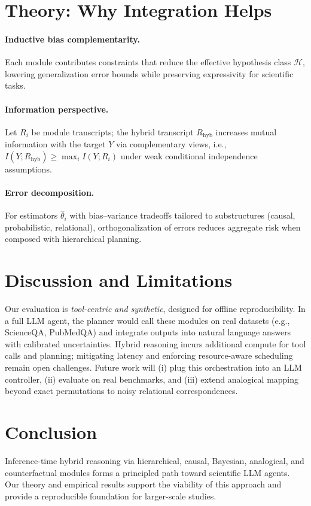 \documentclass[11pt]{article}
\begin{document}
\section{Theory: Why Integration Helps}
\paragraph{Inductive bias complementarity.}
Each module contributes constraints that reduce the effective hypothesis class $\mathcal{H}$, lowering generalization error bounds while preserving expressivity for scientific tasks.
\paragraph{Information perspective.}
Let $R_i$ be module transcripts; the hybrid transcript $R_\mathrm{hyb}$ increases mutual information with the target $Y$ via complementary views, i.e., $I(Y;R_\mathrm{hyb}) \ge \max_i I(Y;R_i)$ under weak conditional independence assumptions.
\paragraph{Error decomposition.}
For estimators $\hat{\theta}_i$ with bias--variance tradeoffs tailored to substructures (causal, probabilistic, relational), orthogonalization of errors reduces aggregate risk when composed with hierarchical planning.

\section{Discussion and Limitations}
Our evaluation is \emph{tool-centric and synthetic}, designed for offline reproducibility. In a full LLM agent, the planner would call these modules on real datasets (e.g., ScienceQA, PubMedQA) and integrate outputs into natural language answers with calibrated uncertainties. Hybrid reasoning incurs additional compute for tool calls and planning; mitigating latency and enforcing resource-aware scheduling remain open challenges. Future work will (i) plug this orchestration into an LLM controller, (ii) evaluate on real benchmarks, and (iii) extend analogical mapping beyond exact permutations to noisy relational correspondences.

\section{Conclusion}
Inference-time hybrid reasoning via hierarchical, causal, Bayesian, analogical, and counterfactual modules forms a principled path toward scientific LLM agents. Our theory and empirical results support the viability of this approach and provide a reproducible foundation for larger-scale studies.



\end{document}
